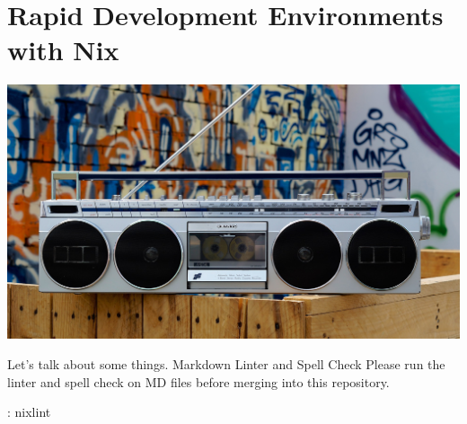 \chapter{Rapid Development Environments with Nix}

\includegraphics[scale=0.85]{images/boombox-5693150_1920.jpg}

\justify{}
Let's talk about some things.
\justify{}
Markdown Linter and Spell Check
\justify{}
Please run the linter and spell check on MD files before merging into this
repository.

\begin{mybox}{\thetcbcounter: nixlint}
    
\end{mybox}
